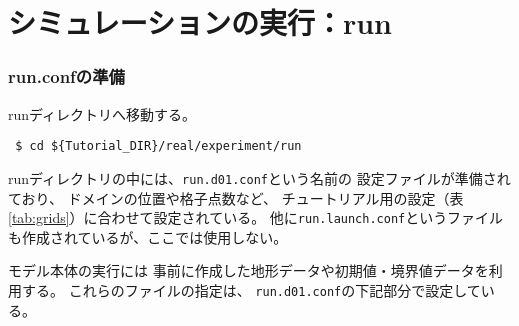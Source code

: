 \section{シミュレーションの実行：run} \label{sec:tutrial_real_run}
\subsubsection{run.confの準備}
runディレクトリへ移動する。
\begin{verbatim}
 $ cd ${Tutorial_DIR}/real/experiment/run
\end{verbatim}
%
runディレクトリの中には、\verb|run.d01.conf|という名前の
設定ファイルが準備されており、
ドメインの位置や格子点数など、
チュートリアル用の設定（表\ref{tab:grids}）に合わせて設定されている。
他に\verb|run.launch.conf|というファイルも作成されているが、ここでは使用しない。

モデル本体の実行には
事前に作成した地形データや初期値・境界値データを利用する。
これらのファイルの指定は、
\verb|run.d01.conf|の下記部分で設定している。\\

